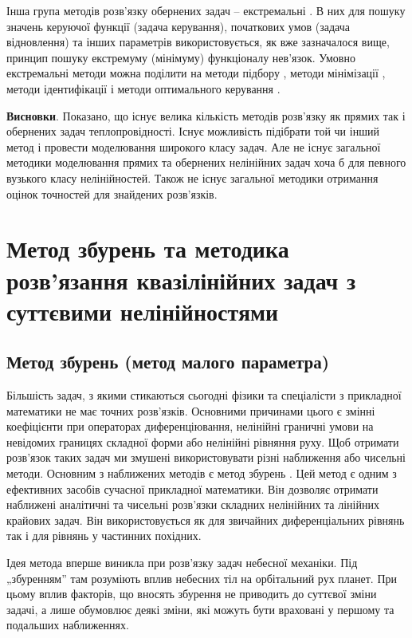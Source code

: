 Інша група методів розв’язку обернених задач – екстремальні \cite{Kozdoba-Metody}. В них для пошуку значень керуючої функції (задача
керування), початкових умов (задача відновлення) та інших параметрів використовується, як вже зазначалося вище,
принцип пошуку екстремуму (мінімуму) функціоналу нев’язок. Умовно екстремальні методи можна поділити на методи
підбору \cite{Arsenin-NekorrektnoPostavlennye}, методи мінімізації \cite{Polak-Chislennye}, методи
ідентифікації \cite{Stoyan-OZadache} і методи оптимального керування \cite{Kirichenko-Obshee}.

\textbf{Висновки}. Показано, що існує велика кількість методів розв’язку як прямих так і обернених задач теплопровідності.
Існує можливість підібрати той чи інший метод  і провести моделювання широкого класу задач.  Але не існує загальної
методики моделювання прямих та обернених нелінійних задач хоча б для певного вузького класу нелінійностей. Також не
існує загальної методики отримання оцінок точностей для знайдених  розв’язків.

\section{Метод збурень та методика розв’язання квазілінійних задач з суттєвими нелінійностями} \label{sect1_2}
\subsection{Метод збурень (метод малого параметра)} \label{sect1_2_1}

Більшість задач, з якими стикаються сьогодні фізики та спеціалісти з прикладної математики не має точних розв’язків.
Основними причинами цього є змінні коефіцієнти при операторах диференціювання, нелінійні граничні умови на невідомих
границях складної форми або нелінійні рівняння руху. Щоб отримати розв’язок таких задач ми змушені використовувати
різні наближення або чисельні методи. Основним з наближених методів є метод збурень
\cite{Van-Dayk-Metody, Coul-Metody, Mitropolskiy-Problemy, Mitropolskiy-Leksii, Nayfe-Vvedenie, Erdein-Asimptoticheskie}.
Цей метод є одним з ефективних засобів сучасної прикладної математики. Він дозволяє отримати наближені аналітичні
та чисельні розв’язки складних нелінійних та лінійних крайових задач. Він використовується як для звичайних
диференціальних рівнянь так і для рівнянь у частинних похідних.

Ідея метода вперше виникла при розв’язку задач небесної механіки. Під „збуренням”  там розуміють вплив небесних
тіл на орбітальний рух планет. При цьому вплив факторів, що вносять збурення не приводить до суттєвої зміни
задачі, а лише обумовлює деякі зміни, які можуть бути враховані у першому та подальших наближеннях.

